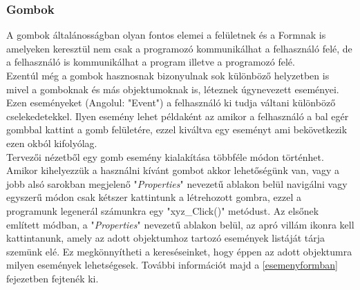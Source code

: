 \documentclass[tocnopagenum]{thesis-ekf}
\theoremstyle{definition}
\theoremstyle{remark}
\begin{document}
	\subsubsection{Gombok}
	\label{Gombok}
	A gombok általánosságban olyan fontos elemei a felületnek és a Formnak is amelyeken keresztül nem csak a programozó kommunikálhat a felhasználó felé, de a felhasználó is kommunikálhat a program illetve a programozó felé. 
	\\
	Ezentúl még a gombok hasznosnak bizonyulnak sok különböző helyzetben is mivel a gomboknak és más objektumoknak is, léteznek úgynevezett eseményei. Ezen eseményeket (Angolul: "Event") a felhasználó ki tudja váltani különböző cselekedetekkel. Ilyen esemény lehet példaként az amikor a felhasználó a bal egér gombbal kattint a gomb felületére, ezzel kiváltva egy eseményt ami bekövetkezik ezen okból kifolyólag.
	\\
	Tervezői nézetből egy gomb esemény kialakítása többféle módon történhet. Amikor kihelyezzük a használni kívánt gombot akkor lehetőségünk van, vagy a jobb alsó sarokban megjelenő "\textit{Properties}" nevezetű ablakon belül navigálni vagy egyszerű módon csak kétszer kattintunk a létrehozott gombra, ezzel a programunk legenerál számunkra egy "xyz\_Click()" metódust.
	Az elsőnek említett módban, a "\textit{Properties}" nevezetű ablakon belül, az apró villám ikonra kell kattintanunk, amely az adott objektumhoz tartozó események listáját tárja szemünk elé. Ez megkönnyítheti a kereséseinket, hogy éppen az adott objektumra milyen események lehetségesek. További információt majd a \ref{esemenyformban} fejezetben fejtenék ki.
\end{document}
